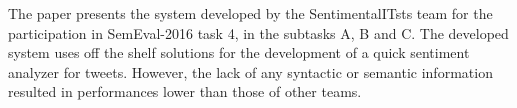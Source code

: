 The paper presents the system developed by the SentimentalITsts team for the participation in SemEval-2016 task 4, in the subtasks A, B and C. The developed system uses off the shelf solutions for the development of a quick sentiment analyzer for tweets. However, the lack of any syntactic or semantic information resulted in performances lower than those of other teams.
